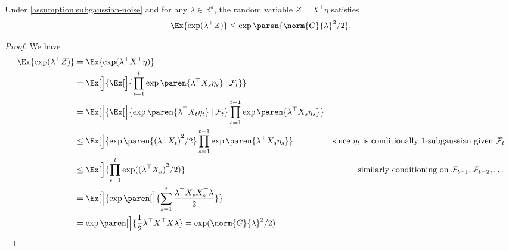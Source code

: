 \documentclass{article}
\newcommand{\Real}{\mathds{R}}
\newcommand\given[1][\delimsize]{%
  \providecommand{\delimsize}{}
  \nonscript\:#1\vert\allowbreak\nonscript\:\mathopen{}
}
\DeclarePairedDelimiter{\paren}()
\providecommand\transp{\top}
\let\transpsymbol\transp
\renewcommand{\transp}[1]{#1^\transpsymbol}
\begin{document}
\begin{lemma}\label{lemma:subgaussian-z}
  Under \cref{assumption:subgaussian-noise} and for any
$\lambda\in\Real^d$, the random variable $Z = \transp{X}\eta$ satisfies
  \begin{align*}
    \Ex{\exp(\transp{\lambda}Z)} \le \exp\paren{\norm{G}{\lambda}^2/2}.
  \end{align*}

  \begin{proof}
    We have
    \begin{align*}
      \Ex{\exp(\transp{\lambda}Z)}
      &= \Ex{\exp(\transp{\lambda}\transp{X}\eta)} \\
      &= \Ex[\Big]{\Ex[\Big]{\prod_{s=1}^t \exp\paren{\transp{\lambda}X_s\eta_s} \given \mathcal{F}_t}} \\
      &= \Ex[\Big]{\Ex[\Big]{\exp\paren{\transp{\lambda}X_t\eta_t} \given \mathcal{F}_t} \prod_{s=1}^{t-1} \exp\paren{\transp{\lambda}X_s\eta_s}} \\
      &\le \Ex[\Big]{\exp\paren{{(\transp{\lambda}X_t)}^2/2}
        \prod_{s=1}^{t-1} \exp\paren{\transp{\lambda}X_s\eta_s}}
      &\text{since $\eta_t$ is conditionally 1-subgaussian given $\mathcal{F}_t$}\\
      &\le \Ex[\Big]{\prod_{s=1}^t\exp({(\transp{\lambda}X_s)}^2/2)}
      &\text{similarly conditioning on $\mathcal{F}_{t-1},\mathcal{F}_{t-2},\dotsc$}\\
      &= \Ex[\Big]{\exp\paren[\Big]{\sum_{s=1}^t\frac{\transp{\lambda}X_s\transp{X_s}\lambda}{2}}} \\
      &= \exp\paren[\Big]{\frac{1}{2}\transp{\lambda}\transp{X}X\lambda}
        = \exp(\norm{G}{\lambda}^2/2)
        \qedhere
    \end{align*}
  \end{proof}
\end{lemma}
\end{document}
